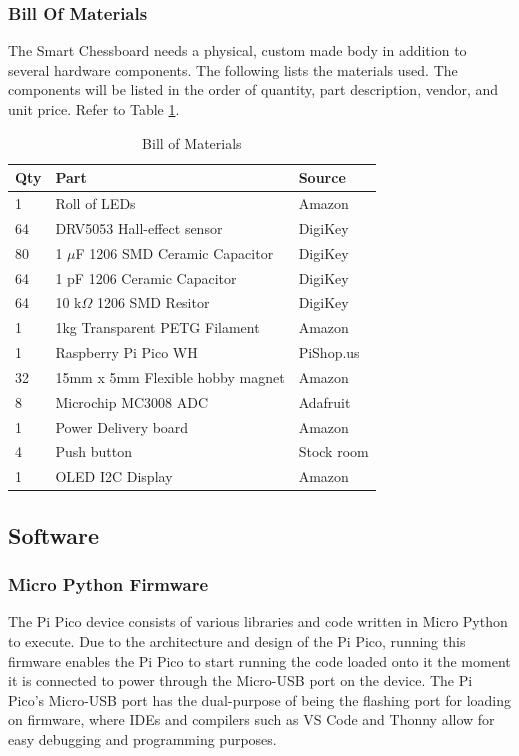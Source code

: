 \documentclass[11pt,journal]{IEEEtran}
\begin{document}
\subsubsection{Bill Of Materials}
The Smart Chessboard needs a physical, custom made body in addition to several hardware components. The following lists the materials used. The components will be listed in the order of quantity, part description, vendor, and unit price. Refer to Table \ref{bomtable}.
\begin{center}
\begin{table}[ht]
\caption{Bill of Materials}
\begin{tabular}{|l|l|l|}
\hline
\textbf{Qty} & \textbf{Part}                        & \textbf{Source} \\ \hline
1            & Roll of LEDs                         & Amazon          \\ \hline
64           & DRV5053 Hall-effect sensor           & DigiKey         \\ \hline
80           & 1 $\mu$F 1206 SMD Ceramic Capacitor  & DigiKey         \\ \hline
64           & 1 pF 1206 Ceramic Capacitor          & DigiKey         \\ \hline
64           & 10 k$\Omega$ 1206 SMD Resitor        & DigiKey         \\ \hline
1            & 1kg Transparent PETG Filament        & Amazon          \\ \hline
1            & Raspberry Pi Pico WH                 & PiShop.us       \\ \hline
32           & 15mm x 5mm Flexible hobby magnet     & Amazon          \\ \hline
8            & Microchip MC3008 ADC                 & Adafruit        \\ \hline
1            & Power Delivery board                 & Amazon          \\ \hline
4            & Push button                          & Stock room      \\ \hline
1            & OLED I2C Display                     & Amazon          \\ \hline
\end{tabular}
\label{bomtable}
\end{table}
\end{center}
\subsection{Software}
\subsubsection{Micro Python Firmware}
The Pi Pico device consists of various libraries and code written in Micro Python to execute. Due to the architecture and design of the Pi Pico, running this firmware enables the Pi Pico to start running the code loaded onto it the moment it is connected to power through the Micro-USB port on the device. The Pi Pico's Micro-USB port has the dual-purpose of being the flashing port for loading on firmware, where IDEs and compilers such as VS Code and Thonny allow for easy debugging and programming purposes.
\end{document}
